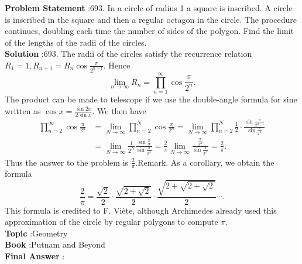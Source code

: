 \documentclass[10pt]{article}
\begin{document}
\textbf{Problem Statement} :693. In a circle of radius 1 a square is inscribed. A circle is inscribed in the square and then a regular octagon in the circle. The procedure continues, doubling each time the number of sides of the polygon. Find the limit of the lengths of the radii of the circles.\\
\textbf{Solution} :693. The radii of the circles satisfy the recurrence relation $R_{1}=1, R_{n+1}=R_{n} \cos \frac{\pi}{2^{n+1}}$. Hence $$ \lim _{n \rightarrow \infty} R_{n}=\prod_{n=1}^{\infty} \cos \frac{\pi}{2^{n}} . $$The product can be made to telescope if we use the double-angle formula for sine written as $\cos x=\frac{\sin 2 x}{2 \sin x}$. We then have$$ \begin{aligned} \prod_{n=2}^{\infty} \cos \frac{\pi}{2^{n}} &=\lim _{N \rightarrow \infty} \prod_{n=2}^{N} \cos \frac{\pi}{2^{n}}=\lim _{N \rightarrow \infty} \prod_{n=2}^{N} \frac{1}{2} \cdot \frac{\sin \frac{\pi}{2^{n-1}}}{\sin \frac{\pi}{2^{n}}} \\ &=\lim _{N \rightarrow \infty} \frac{1}{2^{N}} \frac{\sin \frac{\pi}{2}}{\sin \frac{\pi}{2^{N}}}=\frac{2}{\pi} \lim _{N \rightarrow \infty} \frac{\frac{\pi}{2^{N}}}{\sin \frac{\pi}{2^{N}}}=\frac{2}{\pi} . \end{aligned} $$Thus the answer to the problem is $\frac{2}{\pi}$.Remark. As a corollary, we obtain the formula$$ \frac{2}{\pi}=\frac{\sqrt{2}}{2} \cdot \frac{\sqrt{2+\sqrt{2}}}{2} \cdot \frac{\sqrt{2+\sqrt{2+\sqrt{2}}}}{2} \cdots . $$This formula is credited to F. Viète, although Archimedes already used this approximation of the circle by regular polygons to compute $\pi$.\\
\textbf{Topic} :Geometry\\
\textbf{Book} :Putnam and Beyond\\
\textbf{Final Answer} :\\
\end{document}
